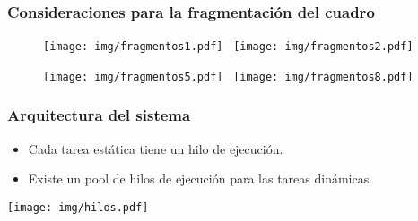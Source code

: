 \documentclass[11pt,a4paper,spanish]{beamer}
\begin{document}
\begin{frame}

\frametitle{Consideraciones para la fragmentación del cuadro}

\begin{figure}[h]

	\texttt{[image: img/fragmentos1.pdf]}~
	\texttt{[image: img/fragmentos2.pdf]}

	\texttt{[image: img/fragmentos5.pdf]}~
	\texttt{[image: img/fragmentos8.pdf]}

\end{figure}

\end{frame}

\begin{frame}

\frametitle{Arquitectura del sistema}

\begin{itemize}

	\item Cada tarea estática tiene un hilo de ejecución.

	\item Existe un pool de hilos de ejecución para las tareas dinámicas.

\end{itemize}

\texttt{[image: img/hilos.pdf]}

\end{frame}
\end{document}
